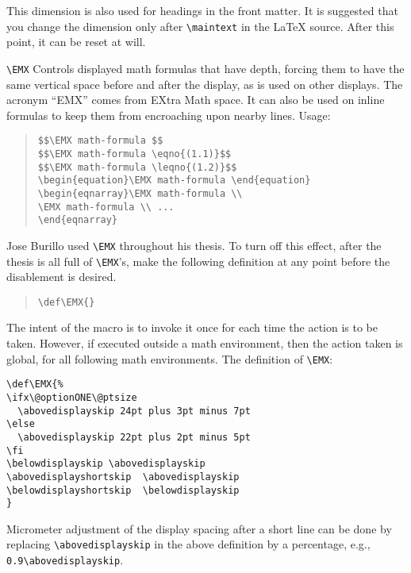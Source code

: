\begin{description}
This dimension is also used for headings in the front matter. It is
suggested that you change the dimension only after \verb"\maintext" in
the \LaTeX{} source. After this point, it can be reset at will.


\item \verb|\EMX|
Controls displayed math formulas that have depth, forcing them to have
the same vertical space before and after the display, as is used on
other displays. The acronym ``EMX'' comes from EXtra Math space. It can also
be used on inline formulas to keep them from encroaching upon nearby
lines. Usage:
\begin{quote}
        \verb|$$\EMX math-formula $$| \\
        \verb|$$\EMX math-formula \eqno{(1.1)}$$| \\
        \verb|$$\EMX math-formula \leqno{(1.2)}$$| \\
        \verb|\begin{equation}\EMX math-formula \end{equation}| \\
        \verb|\begin{eqnarray}\EMX math-formula \\| \\
                        \verb|\EMX math-formula \\ ...| \\
        \verb|\end{eqnarray}|
\end{quote}
Jose Burillo used \verb|\EMX| throughout his thesis. To turn off this
effect, after the thesis is all full of \verb|\EMX|'s, make the
following definition at any point before the disablement is desired.
\begin{quote}
\verb|\def\EMX{}|
\end{quote}
The intent of the macro is to invoke it once for each time the action
is to be taken. However, if executed outside a math environment, then
the action taken is global, for all following math environments.
The definition of \verb|\EMX|:
\begin{verbatim}
\def\EMX{%
\ifx\@optionONE\@ptsize
  \abovedisplayskip 24pt plus 3pt minus 7pt
\else
  \abovedisplayskip 22pt plus 2pt minus 5pt
\fi
\belowdisplayskip \abovedisplayskip
\abovedisplayshortskip  \abovedisplayskip
\belowdisplayshortskip  \belowdisplayskip
}
\end{verbatim}
Micrometer adjustment of the display spacing after a short
line can be done by replacing \verb|\abovedisplayskip| in the above
definition by a percentage, e.g., \verb|0.9\abovedisplayskip|.


\end{description}
